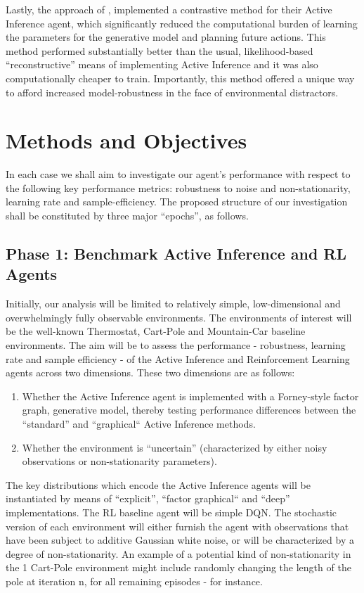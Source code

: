 \documentclass[12pt, oneside]{article}
\begin{document}
Lastly, the approach of \textcite{Contrastive-AIF}, implemented a contrastive method for their Active Inference agent, which significantly reduced the computational burden of learning the parameters for the generative model and planning future actions. This method performed substantially better than the usual, likelihood-based ``reconstructive'' means of implementing Active Inference and it was also computationally cheaper to train. Importantly, this method offered a unique way to afford increased model-robustness in the face of environmental distractors. 


\section{Methods and Objectives}
In each case we shall aim to investigate our agent's performance with respect to the following key performance metrics: robustness to noise and non-stationarity, learning rate and sample-efficiency.
The proposed structure of our investigation shall be constituted by three major ``epochs'', as follows. 

\subsection{Phase 1: Benchmark Active Inference and RL Agents}
Initially, our analysis will be limited to relatively simple, low-dimensional and overwhelmingly fully observable environments. The environments of interest will be the well-known Thermostat, Cart-Pole and Mountain-Car baseline environments. The aim will be to assess the performance - robustness, learning rate and sample efficiency - of the Active Inference and Reinforcement Learning agents across two dimensions. These two dimensions are as follows:
\begin{enumerate}
\item Whether the Active Inference agent is implemented with a Forney-style factor graph, generative model, thereby testing performance differences between the ``standard'' and ``graphical`` Active Inference methods.
\item Whether the environment is ``uncertain'' (characterized by either noisy observations or non-stationarity parameters).
\end{enumerate}

The key distributions which encode the Active Inference agents will be instantiated by means of ``explicit'', ``factor graphical`` and ``deep'' implementations. The RL baseline agent will be simple DQN. The stochastic version of each environment will either furnish the agent with observations that have been subject to additive Gaussian white noise, or will be characterized by a degree of non-stationarity. An example of a potential kind of non-stationarity in the 1
Cart-Pole environment might include randomly changing the length of the pole at iteration n, for all remaining episodes - for instance.  
\end{document}
